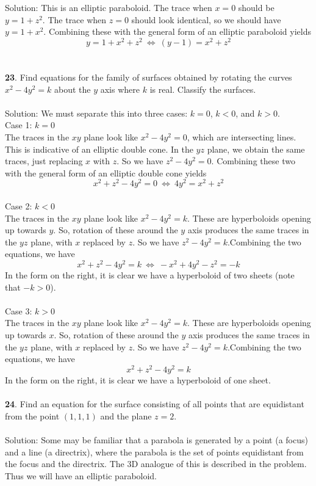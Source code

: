 \documentclass[12pt]{amsbook}
\begin{document}
{\sc Solution}: This is an elliptic paraboloid. The trace when $x=0$ should be $y=1+z^2$. The trace when $z=0$ should look identical, so we should have $y=1+x^2$. Combining these with the general form of an elliptic paraboloid yields
$$y=1+x^2+z^2  \ \Leftrightarrow \ (y-1)=x^2+z^2 $$
\\
\\
{\small\bf 23}. Find equations for the family of surfaces obtained
by rotating the curves $x^2-4y^2=k$ about the $y$ axis
where $k$ is real. Classify the surfaces.\\
\\
{\sc Solution}: We must separate this into three cases: $k=0$, $k<0$, and $k>0$.
\\
Case 1: $k=0$
\\
The traces in the $xy$ plane look like $x^2-4y^2=0$, which are intersecting lines. This is indicative of an elliptic double cone. In the $yz$ plane, we obtain the same traces, just replacing $x$ with $z$. So we have $z^2-4y^2=0$. Combining these two with the general form of an elliptic double cone yields
$$x^2+z^2-4y^2=0 \ \Leftrightarrow \ 4y^2=x^2+z^2$$
\\
Case 2: $k<0$
\\
The traces in the $xy$ plane look like $x^2-4y^2=k$. These are hyperboloids opening up towards $y$. So, rotation of these around the $y$ axis produces the same traces in the $yz$ plane, with $x$ replaced by $z$. So we have $z^2-4y^2=k$.Combining the two equations, we have
$$x^2+z^2-4y^2=k \ \Leftrightarrow \ -x^2+4y^2-z^2=-k$$
In the form on the right, it is clear we have a hyperboloid of two sheets (note that $-k>0$).
\\
\\
Case 3: $k>0$
\\
The traces in the $xy$ plane look like $x^2-4y^2=k$. These are hyperboloids opening up towards $x$. So, rotation of these around the $y$ axis produces the same traces in the $yz$ plane, with $x$ replaced by $z$. So we have $z^2-4y^2=k$.Combining the two equations, we have
$$x^2+z^2-4y^2=k$$
In the form on the right, it is clear we have a hyperboloid of one sheet.
\\
\\
{\small\bf 24}.  Find an equation for the surface consisting of all
points that are equidistant from the point $(1,1,1)$ and the plane
$z=2$.\\
\\
{\sc Solution}: Some may be familiar that a parabola is generated by a point (a focus) and a line (a directrix), where the parabola is the set of points equidistant from the focus and the directrix. The 3D analogue of this is described in the problem. Thus we will have an elliptic paraboloid. 
\end{document}
